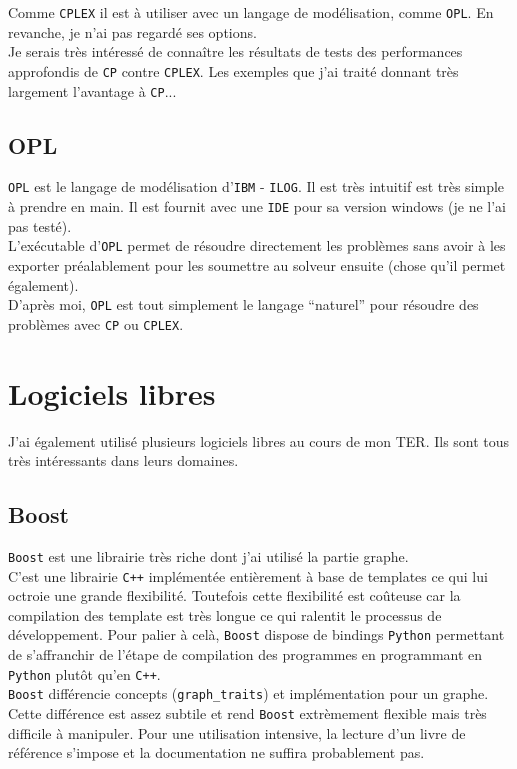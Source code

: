 Comme \verb?CPLEX? il est à utiliser avec un langage de modélisation, comme \verb?OPL?.
En revanche, je n'ai pas regardé ses options.\\

Je serais très intéressé de connaître les résultats de tests des performances approfondis de \verb?CP?
contre \verb?CPLEX?. Les exemples que j'ai traité donnant très largement l'avantage à \verb?CP?...

\subsection{OPL}
\verb?OPL? est le langage de modélisation d'\verb?IBM? - \verb?ILOG?. Il est très intuitif est
très simple à prendre en main. Il est fournit avec une \verb?IDE? pour sa version windows
(je ne l'ai pas testé).\\
L'exécutable d'\verb?OPL? permet de résoudre directement les problèmes sans avoir à les
exporter préalablement pour les soumettre au solveur ensuite (chose qu'il permet également).\\

D'après moi, \verb?OPL? est tout simplement le langage ``naturel'' pour résoudre des
problèmes avec \verb?CP? ou \verb?CPLEX?.

\section{Logiciels libres}
J'ai également utilisé plusieurs logiciels libres au cours de mon TER.
Ils sont tous très intéressants dans leurs domaines.

\subsection{Boost}
\verb?Boost? est une librairie très riche dont j'ai utilisé la partie graphe.\\
C'est une librairie \verb?C++? implémentée entièrement à base de templates
ce qui lui octroie une grande flexibilité. Toutefois cette flexibilité est coûteuse car
la compilation des template est très longue ce qui ralentit le processus de développement.
Pour palier à celà, \verb?Boost? dispose de bindings \verb?Python? permettant de s'affranchir
de l'étape de compilation des programmes en programmant en \verb?Python? plutôt qu'en \verb?C++?.\\
\verb?Boost? différencie concepts (\verb?graph_traits?) et implémentation pour un graphe. Cette 
différence est assez subtile et rend \verb?Boost? extrèmement flexible mais très
difficile à manipuler. Pour une utilisation intensive, la lecture d'un livre de référence
s'impose et la documentation ne suffira probablement pas.\\

